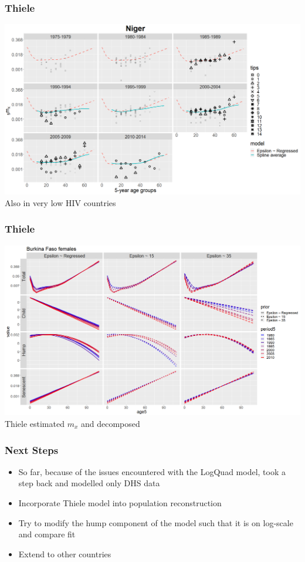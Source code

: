 \documentclass[hyperref={colorlinks, citecolor=blue}]{beamer}
\begin{document}
\begin{frame}
\frametitle{Thiele}
\includegraphics[width=\linewidth]{Graphs/Niger female.png}
Also in very low HIV countries
\end{frame}

\begin{frame}
\frametitle{Thiele}
\includegraphics[width=\linewidth]{Graphs/Thiele female decomp.png}
Thiele estimated $m_x$ and decomposed
\end{frame}

\begin{frame}
\frametitle{Next Steps}
\begin{itemize}
\item So far, because of the issues encountered with the LogQuad model, took a step back and modelled only DHS data
\item Incorporate Thiele model into population reconstruction
\item Try to modify the hump component of the model such that it is on log-scale and compare fit
\item Extend to other countries
\end{itemize}
\end{frame}



\end{document}
